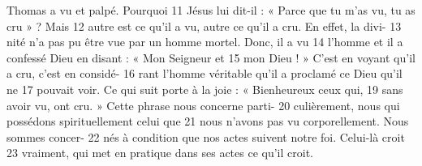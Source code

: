 Thomas a vu et palpé. Pourquoi	 
11	 	Jésus lui dit-il : « Parce que tu m'as vu, tu as cru » ? Mais	 
12	 	autre est ce qu'il a vu, autre ce qu'il a cru. En effet, la divi-	 
13	 	nité n'a pas pu être vue par un homme mortel. Donc, il a vu	 
14	 	l'homme et il a confessé Dieu en disant : « Mon Seigneur et	 
15	 	mon Dieu ! » C'est en voyant qu'il a cru, c'est en considé-	 
16	 	rant l'homme véritable qu'il a proclamé ce Dieu qu'il ne	 
17	 	pouvait voir.
Ce qui suit porte à la joie : « Bienheureux ceux qui,	 
19	 	sans avoir vu, ont cru. » Cette phrase nous concerne parti-	 
20	 	culièrement, nous qui possédons spirituellement celui que	 
21	 	nous n'avons pas vu corporellement. Nous sommes concer-	 
22	 	nés à condition que nos actes suivent notre foi. Celui-là croit	 
23	 	vraiment, qui met en pratique dans ses actes ce qu'il croit.